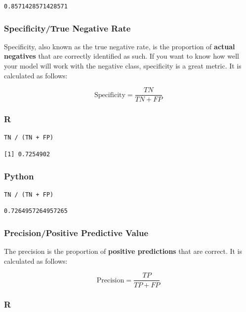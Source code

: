 \documentclass[
  letterpaper,
]{krantz}
\begin{document}
\begin{verbatim}
0.8571428571428571
\end{verbatim}

\subsubsection{Specificity/True Negative
Rate}\label{sec-knowing-metrics-specificity}

Specificity, also known as the true negative rate, is the proportion of
\textbf{actual negatives} that are correctly identified as such. If you
want to know how well your model will work with the negative class,
specificity is a great metric. It is calculated as follows:

\[\text{Specificity} = \frac{TN}{TN + FP}\]

\subsubsection{R}

\begin{verbatim}
TN / (TN + FP)
\end{verbatim}

\begin{verbatim}
[1] 0.7254902
\end{verbatim}

\subsubsection{Python}

\begin{verbatim}
TN / (TN + FP)
\end{verbatim}

\begin{verbatim}
0.7264957264957265
\end{verbatim}

\subsubsection{Precision/Positive Predictive
Value}\label{sec-knowing-metrics-precision}

The precision is the proportion of \textbf{positive predictions} that
are correct. It is calculated as follows:

\[\text{Precision} = \frac{TP}{TP + FP}\]

\subsubsection{R}
\end{document}
